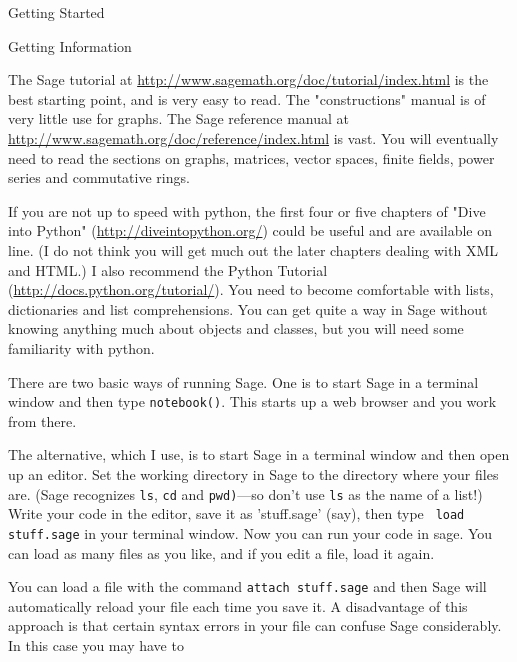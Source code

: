 \begin{chap}{Getting Started}
    
\begin{sect}{Getting Information}
%
\begin{para}
The Sage tutorial at \url{http://www.sagemath.org/doc/tutorial/index.html}
is the best starting point, and is very easy to read.  The "constructions" manual 
is of very little use for graphs. The Sage reference manual at
\url{http://www.sagemath.org/doc/reference/index.html} is vast. You will eventually 
need to read the sections on graphs, matrices, vector spaces, finite fields,
power series and commutative rings.
\end{para}
%
\begin{para}
If you are not up to speed with python, the first four or five chapters of 
"Dive into Python"  (\url{http://diveintopython.org/})
could be useful and are available on line.  (I do not think
you will get much out the later chapters dealing with XML and HTML.)
I also recommend the Python Tutorial (\url{http://docs.python.org/tutorial/}).  
You need to become comfortable with lists, dictionaries and list comprehensions.
You can get quite a way in Sage without knowing anything much about objects 
and classes, but you will need some familiarity with python.
\end{para}
%
\begin{para}
There are two basic ways of running Sage.  One is to start Sage in a
terminal window and then type \texttt{notebook()}.  This starts up a 
web browser and you work from there.
\end{para}
%
\begin{para}
The alternative, which I use, is to start Sage in a terminal window and then 
open up an editor. Set the working directory in Sage to the directory where your 
files are. (Sage recognizes \texttt{ls}, \texttt{cd} and \texttt{pwd)}---so don't use
\texttt{ls} as the name of a list!) Write your code in the editor, save it as
'stuff.sage' (say), then type  \texttt{ load stuff.sage} in your terminal window. 
Now you can run your code in sage. You can load as many files as you like, and if 
you edit a file, load it again.
\end{para}
%
\begin{para}
You can load a file with the command \texttt{attach stuff.sage} and then
Sage will automatically reload your file each time
you save it.  A disadvantage of this approach is that certain syntax errors 
in your file can confuse Sage considerably.  In this case you may have to 

\end{para}
\end{sect}
\end{chap}
